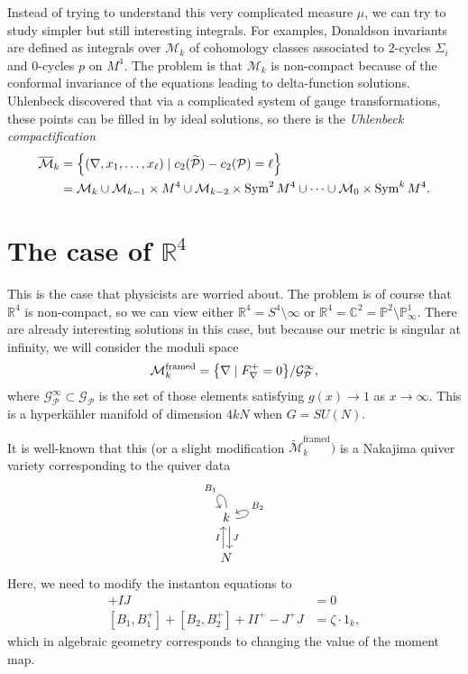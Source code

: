 \documentclass[leqno, openany]{memoir}
\theoremstyle{definition}
\theoremstyle{remark}
\theoremstyle{plain}
\theoremstyle{definition}
\theoremstyle{remark}
\newcommand{\R}{\mathbb{R}}
\newcommand{\C}{\mathbb{C}}
\renewcommand{\P}{\mathbb{P}}
\newcommand{\mc}[1]{\mathcal{#1}}
\newcommand{\mr}[1]{\mathrm{#1}}
\newcommand{\on}[1]{\operatorname{#1}}
\newcommand{\ol}[1]{\overline{#1}}
\newcommand{\wt}[1]{\widetilde{#1}}
\begin{document}
Instead of trying to understand this very complicated measure $\mu$, we can try to study simpler but still interesting integrals. For examples, Donaldson invariants are defined as integrals over $\mc{M}_k$ of cohomology classes associated to $2$-cycles $\Sigma_i$ and $0$-cycles $p$ on $M^4$. The problem is that $\mc{M}_k$ is non-compact because of the conformal invariance of the equations leading to delta-function solutions. Uhlenbeck discovered that via a complicated system of gauge transformations, these points can be filled in by ideal solutions, so there is the \textit{Uhlenbeck compactification}
\begin{align*}
    \ol{\mc{M}}_k &= \qty{(\nabla, x_1, \ldots, x_{\ell}) \mid c_2(\wt{\mc{P}}) - c_2(\mc{P}) = \ell} \\
    &= \mc{M}_k \cup \mc{M}_{k-1} \times M^4 \cup \mc{M}_{k-2} \times \on{Sym}^2 M^4 \cup  \cdots \cup \mc{M}_0 \times \on{Sym}^k M^4.
\end{align*}

\section{The case of $\R^4$}

This is the case that physicists are worried about. The problem is of course that $\R^4$ is non-compact, so we can view either $\R^4 = S^4 \setminus \infty$ or $\R^4 = \C^2 = \P^2 \setminus \P^1_{\infty}$. There are already interesting solutions in this case, but because our metric is singular at infinity, we will consider the moduli space
\[ \mc{M}_k^{\mr{framed}} = \qty{\nabla \mid F_{\nabla}^+ = 0} / \mc{G}_{\mc{P}}^{\infty}, \]
where $\mc{G}_{\mc{P}}^{\infty} \subset \mc{G}_{\mc{P}}$ is the set of those elements satisfying $g(x) \to 1$ as $x \to \infty$. This is a hyperk\"ahler manifold of dimension $4kN$ when $G = SU(N)$.

It is well-known that this (or a slight modification $\wt{\mc{M}}_k^{\mr{framed}})$ is a Nakajima quiver variety corresponding to the quiver data
\begin{equation*}
\begin{tikzcd}
    k \ar[shift left=1]{d}{J} \arrow[out=0,in=30,loop,swap,"B_2"] \arrow[out=90,in=120,loop,swap,"B_1"]\\
    N \ar[shift left=1]{u}{I}
\end{tikzcd}
\end{equation*}
Here, we need to modify the instanton equations to
\begin{align*}
    [B_1, B_2] + IJ &= 0 \\
    [B_1, B_1^+] + [B_2, B_2^+] + I I^+ - J^+ J &= \zeta \cdot 1_k,
\end{align*}
which in algebraic geometry corresponds to changing the value of the moment map.
\end{document}
